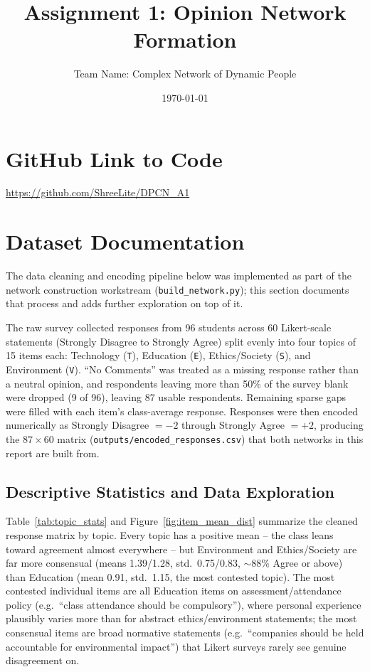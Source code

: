 \documentclass[11pt]{article}
\title{Assignment 1: Opinion Network Formation}
\author{Team Name: Complex Network of Dynamic People}
\date{\today}
\begin{document}
\maketitle

\section*{GitHub Link to Code}
\url{https://github.com/ShreeLite/DPCN_A1}

\section{Dataset Documentation}
\label{sec:dataset}

The data cleaning and encoding pipeline below was implemented as part of the network
construction workstream (\texttt{build\_network.py}); this section documents that
process and adds further exploration on top of it.

The raw survey collected responses from 96 students across 60 Likert-scale statements
(Strongly Disagree to Strongly Agree) split evenly into four topics of 15 items each:
Technology (\texttt{T}), Education (\texttt{E}), Ethics/Society (\texttt{S}), and
Environment (\texttt{V}). ``No Comments'' was treated as a missing response rather than
a neutral opinion, and respondents leaving more than 50\% of the survey blank were
dropped (9 of 96), leaving 87 usable respondents. Remaining sparse gaps were filled with
each item's class-average response. Responses were then encoded numerically as Strongly
Disagree $=-2$ through Strongly Agree $=+2$, producing the $87 \times 60$ matrix
(\texttt{outputs/encoded\_responses.csv}) that both networks in this report are built
from.

\subsection*{Descriptive Statistics and Data Exploration}

Table~\ref{tab:topic_stats} and Figure~\ref{fig:item_mean_dist} summarize the cleaned
response matrix by topic. Every topic has a positive mean -- the class leans toward
agreement almost everywhere -- but Environment and Ethics/Society are far more
consensual (means 1.39/1.28, std.\ 0.75/0.83, $\sim$88\% Agree or above) than Education
(mean 0.91, std.\ 1.15, the most contested topic). The most contested individual items
are all Education items on assessment/attendance policy (e.g.\ ``class attendance
should be compulsory''), where personal experience plausibly varies more than for
abstract ethics/environment statements; the most consensual items are broad normative
statements (e.g.\ ``companies should be held accountable for environmental impact'')
that Likert surveys rarely see genuine disagreement on.
\end{document}
